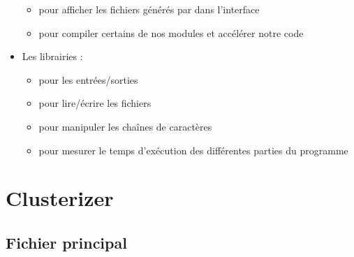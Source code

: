 \documentclass[letterpaper,10pt,french]{sphinxmanual}
\begin{document}
\begin{itemize}
\begin{itemize}
\item {} 
\sphinxAtStartPar
{} pour afficher
les fichiers  générés par  dans l’interface

\item {} 
\sphinxAtStartPar
{} pour compiler certains de nos
modules et accélérer notre code

\end{itemize}

\item {} 
\sphinxAtStartPar
Les librairies  :
\begin{itemize}
\item {} 
\sphinxAtStartPar
{} pour les entrées/sorties

\item {} 
\sphinxAtStartPar
{} pour lire/écrire les fichiers

\item {} 
\sphinxAtStartPar
{} pour manipuler les chaînes de caractères

\item {} 
\sphinxAtStartPar
{} pour mesurer le temps d’exécution des différentes
parties du programme

\end{itemize}

\end{itemize}


\chapter{Clusterizer}
\label{\detokenize{index:clusterizer}}

\section{Fichier principal}
\label{\detokenize{index:module-src.clusterizer.clusterizer}}\label{\detokenize{index:fichier-principal}}
\end{document}
